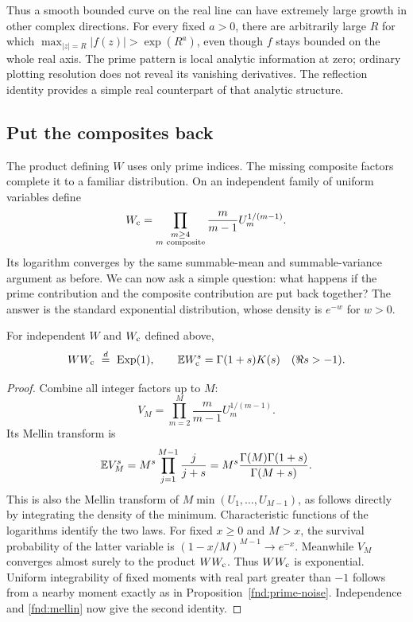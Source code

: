 Thus a smooth bounded curve on the real line can have extremely
large growth in other complex directions.  For every fixed $a>0$, there are arbitrarily large $R$ for which
$\max_{|z|=R}|f(z)|>\exp(R^a)$, even though $f$ stays bounded on the
whole real axis. The prime pattern is
local analytic information at zero; ordinary plotting resolution
does not reveal its vanishing derivatives.  The reflection identity
provides a simple real counterpart of that analytic structure.

\subsection{Put the composites back}

The product defining $W$ uses only prime indices.  The missing
composite factors complete it to a familiar distribution.  On an
independent family of uniform variables define
\begin{equation}
 W_{\mathrm c}=\prod_{\substack{m\ge4\\m\text{ composite}}}
       \frac m{m-1}U_m^{1/(m-1)}.
 \label{fnd:composite-noise}
\end{equation}
Its logarithm converges by the same summable-mean and summable-variance
argument as before. We can now ask a simple question: what happens if
the prime contribution and the composite contribution are put back
together? The answer is the standard exponential distribution, whose
density is $e^{-w}$ for $w>0$.

\begin{proposition}\label{fnd:completion}
For independent $W$ and $W_{\mathrm c}$ defined above,
\begin{equation}
 W\Comp\ \overset{d}=\ \operatorname{Exp}(1),\qquad
 \E \Comp^s=\Gamma(1+s)K(s)\quad(\Re s>-1).
 \label{fnd:completion-law}
\end{equation}
\end{proposition}
\begin{proof}
Combine all integer factors up to $M$:
\[
 V_M=\prod_{m=2}^{M}\frac m{m-1}U_m^{1/(m-1)}.
\]
Its Mellin transform is
\[
 \mathbb E V_M^s=M^s\prod_{j=1}^{M-1}\frac j{j+s}
 =M^s\frac{\Gamma(M)\Gamma(1+s)}{\Gamma(M+s)}.
\]
This is also the Mellin transform of
$M\min(U_1,\ldots,U_{M-1})$, as follows directly by integrating
the density of the minimum.  Characteristic functions of the
logarithms identify the two laws.  For fixed $x\ge0$ and $M>x$,
the survival probability of the latter variable is
$(1-x/M)^{M-1}\to e^{-x}$.  Meanwhile $V_M$ converges almost
surely to the product $WW_{\mathrm c}$.  Thus $WW_{\mathrm c}$ is exponential.
Uniform integrability of fixed moments with real part greater
than $-1$ follows from a nearby moment exactly as in
Proposition~\ref{fnd:prime-noise}.  Independence and
\eqref{fnd:mellin} now give the second identity.
\end{proof}

